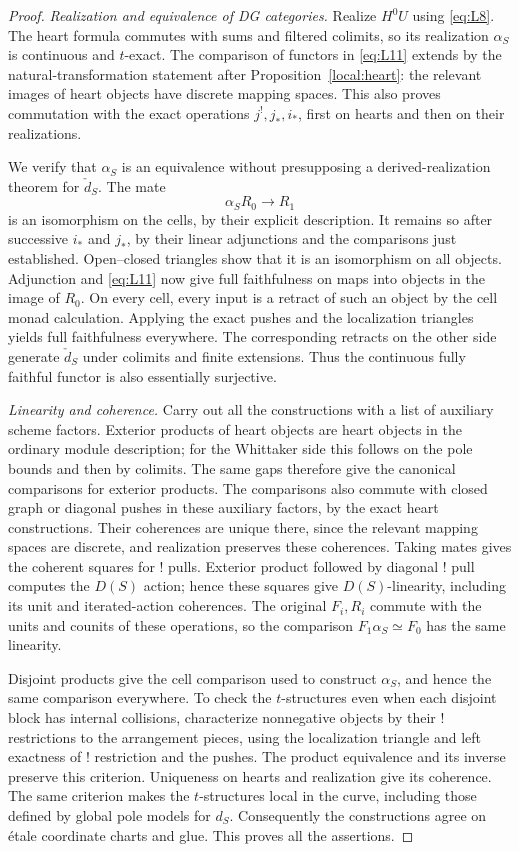\begin{proof}
\smallskip
\noindent\emph{Realization and equivalence of DG categories.}
Realize $H^0U$ using \eqref{eq:L8}.  The heart formula commutes
with sums and filtered colimits, so its realization $\alpha_S$
is continuous and $t$-exact.  The comparison of functors in
\eqref{eq:L11} extends by the natural-transformation statement
after Proposition~\ref{local:heart}: the relevant images of
heart objects have discrete mapping spaces.  This also proves
commutation with the exact operations $j^!,j_*,i_*$, first on
hearts and then on their realizations.

We verify that $\alpha_S$ is an equivalence without presupposing
a derived-realization theorem for $\check d_S$.  The mate
\[
                            \alpha_SR_0\longrightarrow R_1
\]
is an isomorphism on the cells, by their explicit description.
It remains so after successive $i_*$ and $j_*$, by their linear
adjunctions and the comparisons just established.  Open--closed
triangles show that it is an isomorphism on all objects.
Adjunction and \eqref{eq:L11} now give full faithfulness on maps
into objects in the image of $R_0$.  On every cell, every input
is a retract of such an object by the cell monad calculation.
Applying the exact pushes and the localization triangles yields
full faithfulness everywhere.  The corresponding retracts on
the other side generate $\check d_S$ under colimits and finite
extensions.  Thus the continuous fully faithful functor is also
essentially surjective.

\smallskip
\noindent\emph{Linearity and coherence.}
Carry out all the
constructions with a list of auxiliary scheme factors.  Exterior
products of heart objects are heart objects in the ordinary
module description; for the Whittaker side this follows on the
pole bounds and then by colimits.  The same gaps therefore give
the canonical comparisons for exterior products.  The comparisons
also commute with closed graph or diagonal pushes in these
auxiliary factors, by the exact heart constructions.  Their
coherences are unique there, since the relevant mapping spaces
are discrete, and realization preserves these coherences.
Taking mates gives the coherent squares for ! pulls.  Exterior
product followed by diagonal ! pull computes the $D(S)$ action;
hence these squares give $D(S)$-linearity, including its unit
and iterated-action coherences.  The original $F_i,R_i$ commute
with the units and counits of these operations, so the comparison
$F_1\alpha_S\simeq F_0$ has the same linearity.

Disjoint products give the cell comparison used to construct
$\alpha_S$, and hence the same comparison everywhere.  To check
the $t$-structures even when each disjoint block has internal
collisions, characterize nonnegative objects by their !
restrictions to the arrangement pieces, using the localization
triangle and left exactness of ! restriction and the pushes.
The product equivalence and its inverse preserve this criterion.
Uniqueness on hearts and realization give its coherence.
The same criterion makes the $t$-structures local in the curve,
including those defined by global pole models for $d_S$.
Consequently the constructions agree on étale coordinate charts
and glue.  This proves all the assertions.
\end{proof}

